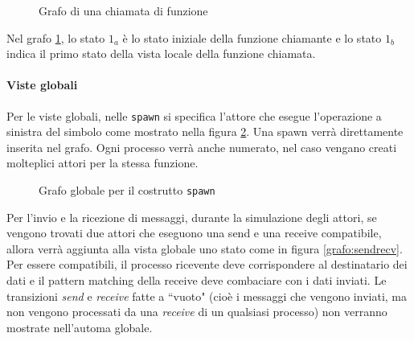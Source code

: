 \begin{figure}[ht!]
    \centering
    \caption{Grafo di una chiamata di funzione}
    \label{grafo:funcall}
\end{figure}

Nel grafo \ref{grafo:funcall}, lo stato $1_a$ \`e lo stato iniziale della funzione chiamante e lo stato $1_b$ indica il primo stato della vista locale della funzione chiamata.

\paragraph{Viste globali}

Per le viste globali, nelle \texttt{spawn} si specifica l'attore che esegue l'operazione a sinistra del simbolo come mostrato nella figura \ref{grafo:globspawn}. Una spawn verr\`a direttamente inserita nel grafo. Ogni processo verr\`a anche numerato, nel caso vengano creati molteplici attori per la stessa funzione.

\bigskip

\begin{figure}[ht!]
    \centering
    \caption{Grafo globale per il costrutto \texttt{spawn}}
    \label{grafo:globspawn}
\end{figure}

\bigskip

Per l'invio e la ricezione di messaggi, durante la simulazione degli attori, se vengono trovati due attori che eseguono una send e una receive compatibile, allora verr\`a aggiunta alla vista globale uno stato come in figura \ref{grafo:sendrecv}. Per essere compatibili, il processo ricevente deve corrispondere al destinatario dei dati e il pattern matching della receive deve combaciare con i dati inviati. Le transizioni \textit{send} e \textit{receive} fatte a ``vuoto" (cio\`e i messaggi che vengono inviati, ma non vengono processati da una \textit{receive} di un qualsiasi processo) non verranno mostrate nell'automa globale.

